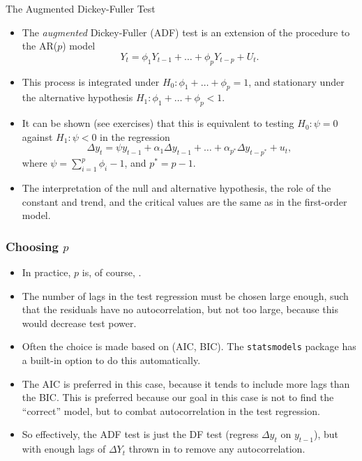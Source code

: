 \begin{frame}{The Augmented Dickey-Fuller Test}
\begin{itemize}

\item The \emph{\color{red}augmented} Dickey-Fuller (ADF) test is an
extension of the procedure to the AR($p$) model
\begin{equation*}
Y_{t}= \phi _{1}Y_{t-1}+\ldots +\phi_{p}Y_{t-p}+ U_{t}.
\end{equation*}%
\item This process is integrated under $H_0: \phi_1 + \ldots + \phi_p = 1$, and
stationary under the alternative hypothesis $H_1: \phi_1 + \ldots + \phi_p <
1$.

\item It can be shown (see exercises) that this is equivalent to testing $H_0: \psi = 0$ against $%
H_1: \psi<0$ in the regression
\begin{equation*}
\Delta y_{t}= \psi y_{t-1}+\alpha _{1} \Delta y_{t-1}+\ldots +\alpha _{p^*}
\Delta y_{t-{p^*}}+ u _{t},
\end{equation*}
where $\psi =\sum_{i=1}^{p}\phi _{i}-1$, and $p^* = p-1$.

\item The interpretation of the null and alternative hypothesis, the role of the
constant and trend, and the critical values are the same as in the
first-order model.
\end{itemize}
\end{frame}
\begin{frame}
\frametitle{Choosing $p$}
\begin{itemize}
\item In practice,  $p$ is, of course, .
\item The number of lags in the test regression must be chosen large enough, such that the residuals
have no autocorrelation, but not too large, because this would
decrease test power.
\item Often the choice is made based on  (AIC, BIC). The \texttt{statsmodels} package has a built-in option to
do this automatically.
\item The AIC is preferred in this case, because it tends to include more lags than the BIC. This is preferred because our goal in this case is not to find the ``correct'' model, but to combat autocorrelation in the test regression.
\item So effectively, the ADF test is just the DF test (regress $\Delta y_t$ on $y_{t-1}$), but with enough lags of $\Delta Y_t$ thrown in to remove any autocorrelation.
\end{itemize}
\end{frame}
